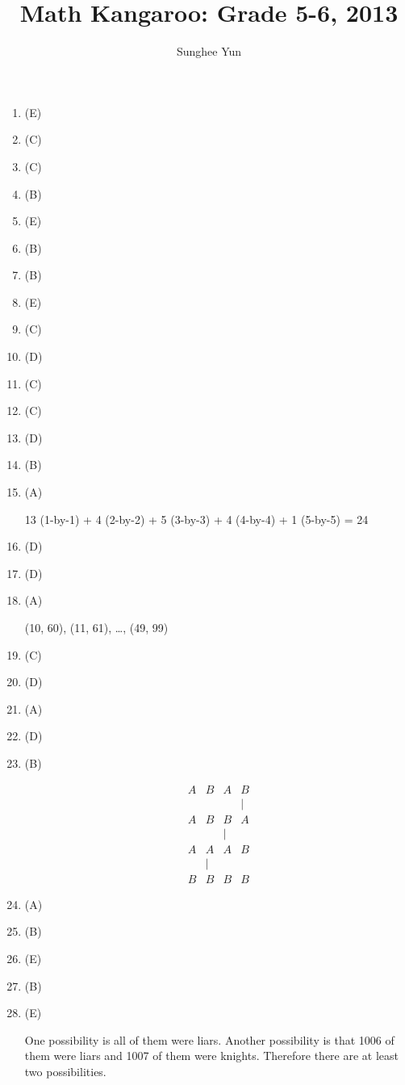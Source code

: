 \documentclass{article}
\title{Math Kangaroo: Grade 5-6, 2013}
\author{Sunghee Yun}
\begin{document}
\maketitle

\begin{enumerate}
\item (E)
\item (C)
\item (C)
\item (B)
\item (E)
\item (B)
\item (B)
\item (E)
\item (C)
\item (D)
\item (C)
\item (C)
\item (D)
\item (B)
\item (A)
\begin{solution}
13 (1-by-1)
+ 4 (2-by-2)
+ 5 (3-by-3)
+ 4 (4-by-4)
+ 1 (5-by-5)
= 24
\end{solution}
\item (D)
\item (D)
\item (A)
\begin{solution}
(10, 60), (11, 61), \ldots, (49, 99)
\end{solution}
\item (C)
\item (D)
\item (A)
\item (D)
\item (B)
\begin{solution}
\[
\begin{array}{cccc}
A&B&A&B
\\
 & & &|
\\
A&B&B&A
\\
 & &|
\\
A&A&A&B
\\
& |
\\
B&B&B&B
\end{array}
\]
\end{solution}

\item (A)
\item (B)
\item (E)
\item (B)

\item (E)
\begin{solution}
One possibility is all of them were liars.
Another possibility is that 1006 of them were liars and 1007 of them were knights.
Therefore there are at least two possibilities.
\end{solution}


\end{enumerate}
\end{document}
